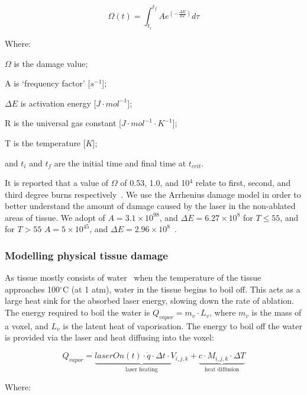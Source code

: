 \begin{equation}
\Omega(t)=\int^{t_{f}}_{t_i} Ae^{(-\tfrac{\Delta E}{RT})}d\tau
\label{eqn:arrhenius}
\end{equation}


\noindent Where:

	\indent $\Omega$ is the damage value;
	
	\indent A is `frequency factor' [$s^{-1}$];
	
	\indent $\Delta E$ is activation energy [$J\cdot mol^{-1}$];
	
	\indent R is the universal gas constant [$J\cdot mol^{-1}\cdot K^{-1}$];
	
	\indent T is the temperature [$K$];
	
	\indent and $t_i$ and $t_f$ are the initial time and final time at $t_{crit}$.
	
	\medskip

It is reported that a value of $\Omega$ of 0.53, 1.0, and 10$^4$ relate to first, second, and third degree burns respectively~\cite{diller1983finite}. We use the Arrhenius damage model in order to better understand the amount of damage caused by the laser in the non-ablated areas of tissue. We adopt of $A=3.1\times10^{98}$, and $\Delta E=6.27\times10^8$ for $T\leq55$, and for $T>55$ $A=5\times10^{45}$, and $\Delta E=2.96\times10^8$~\cite{ye2017thermal}.

\subsubsection{Modelling physical tissue damage}

As tissue mostly consists of water~\cite{meglinski2002quantitative} when the temperature of the tissue approaches 100$^{\circ}$C (at 1 atm), water in the tissue begins to boil off. This acts as a large heat sink for the absorbed laser energy, slowing down the rate of ablation. The energy required to boil the water is $Q_{vapor}=m_v\cdot L_v$, where $m_v$ is the mass of a voxel, and $L_v$ is the latent heat of vaporisation. The energy to boil off the water is provided via the laser and heat diffusing into the voxel:

\begin{equation}
Q_{vapor}=\underbrace{laserOn(t)\cdot\dot{q}\cdot \Delta t\cdot V_{i,j,k}}_\text{laser heating} + \underbrace{c\cdot M_{i,j,k}\cdot\Delta T}_\text{heat diffusion}
\end{equation}

\noindent Where:

